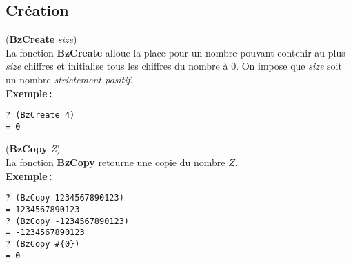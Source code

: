\subsection{Cr\'eation}
({\bf BzCreate} {\em size})
\\[12pt]
La fonction {\bf BzCreate} alloue la place pour un nombre pouvant contenir
au plus {\em size} chiffres et initialise tous les chiffres du nombre \`a 0.
On impose que {\em size} soit un nombre {\em strictement positif}.
\\[18pt]
{\bf Exemple\,:}
\begin{verbatim}
? (BzCreate 4)
= 0
\end{verbatim}
\vspace*{24pt}
({\bf BzCopy} {\em Z})
\\[12pt]
La fonction {\bf BzCopy} retourne une copie du nombre $Z$.
\\[18pt]
{\bf Exemple\,:}
\begin{verbatim}
? (BzCopy 1234567890123)
= 1234567890123
? (BzCopy -1234567890123)
= -1234567890123
? (BzCopy #{0})
= 0
\end{verbatim}
\vspace*{15pt}

